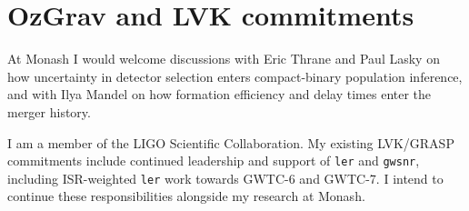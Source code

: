 \documentclass[11pt]{article}
\begin{document}
\section*{OzGrav and LVK commitments}

At Monash I would welcome discussions with Eric Thrane and Paul Lasky on how uncertainty in detector selection enters compact-binary population inference, and with Ilya Mandel on how formation efficiency and delay times enter the merger history.

I am a member of the LIGO Scientific Collaboration. My existing LVK/GRASP commitments include continued leadership and support of \texttt{ler} and \texttt{gwsnr}, including ISR-weighted \texttt{ler} work towards GWTC-6 and GWTC-7. I intend to continue these responsibilities alongside my research at Monash.
\end{document}

